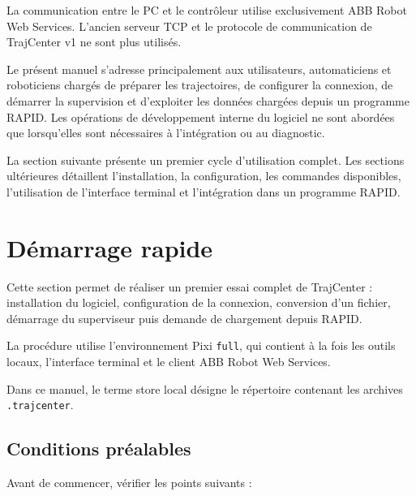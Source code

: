 \documentclass{rapportENSAM}
\begin{document}
La communication entre le PC et le contrôleur utilise exclusivement ABB Robot Web Services. L'ancien serveur TCP et le protocole de communication de TrajCenter v1 ne sont plus utilisés.

Le présent manuel s'adresse principalement aux utilisateurs, automaticiens et roboticiens chargés de préparer les trajectoires, de configurer la connexion, de démarrer la supervision et d'exploiter les données chargées depuis un programme RAPID. Les opérations de développement interne du logiciel ne sont abordées que lorsqu'elles sont nécessaires à l'intégration ou au diagnostic.

La section suivante présente un premier cycle d'utilisation complet. Les sections ultérieures détaillent l'installation, la configuration, les commandes disponibles, l'utilisation de l'interface terminal et l'intégration dans un programme RAPID.



\section{Démarrage rapide}
\label{sec:quick-start}

Cette section permet de réaliser un premier essai complet de TrajCenter : installation du logiciel, configuration de la connexion, conversion d'un fichier, démarrage du superviseur puis demande de chargement depuis RAPID.

La procédure utilise l'environnement Pixi \texttt{full}, qui contient à la fois les outils locaux, l'interface terminal et le client ABB Robot Web Services.

Dans ce manuel, le terme \og store local \fg{} désigne le répertoire contenant
les archives \texttt{.trajcenter}.

\subsection{Conditions préalables}
\label{subsec:quick-start-prerequisites}

Avant de commencer, vérifier les points suivants :
\end{document}
